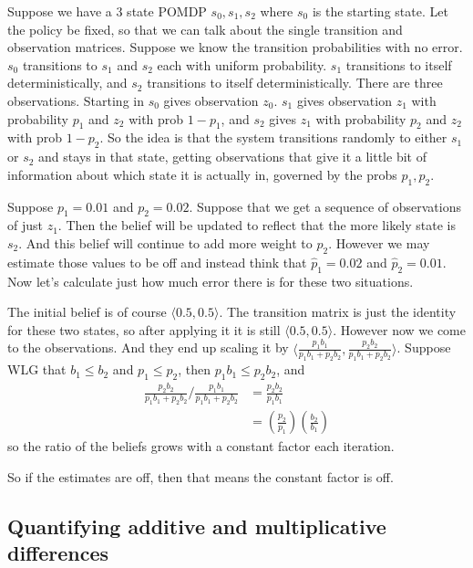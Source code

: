 \documentclass[10pt,english]{article}
\begin{document}
Suppose we have a 3 state POMDP $s_0, s_1, s_2$ where $s_0$ is the starting state. Let the policy be fixed, so that we can talk about the single transition and observation matrices. Suppose we know the transition probabilities with no error. $s_0$ transitions to $s_1$ and $s_2$ each with uniform probability. $s_1$ transitions to itself deterministically, and $s_2$ transitions to itself deterministically. There are three observations. Starting in $s_0$ gives observation $z_0$. $s_1$ gives observation $z_1$ with probability $p_1$ and $z_2$ with prob $1-p_1$, and $s_2$ gives $z_1$ with probability $p_2$ and $z_2$ with prob $1-p_2$. So the idea is that the system transitions randomly to either $s_1$ or $s_2$ and stays in that state, getting observations that give it a little bit of information about which state it is actually in, governed by the probs $p_1,p_2$.

Suppose $p_1 = 0.01$ and $p_2 = 0.02$. Suppose that we get a sequence of observations of just $z_1$. Then the belief will be updated to reflect that the more likely state is $s_2$. And this belief will continue to add more weight to $p_2$. However we may estimate those values to be off and instead think that $\hat{p}_1 = 0.02$ and $\hat{p}_2 = 0.01$. Now let's calculate just how much error there is for these two situations.

The initial belief is of course $\langle 0.5, 0.5 \rangle$. The transition matrix is just the identity for these two states, so after applying it it is still $\langle 0.5, 0.5 \rangle$. However now we come to the observations. And they end up scaling it by $\langle \frac{p_1 b_1}{p_1 b_1 + p_2 b_2} , \frac{p_2 b_2}{p_1 b_1 + p_2 b_2} \rangle$. Suppose WLG that $b_1 \leq b_2$ and $p_1 \leq p_2$, then $p_1 b_1 \leq p_2 b_2$, and
\begin{align}
\frac{p_2 b_2}{p_1 b_1 + p_2 b_2} / \frac{p_1 b_1}{p_1 b_1 + p_2 b_2} &= \frac{p_2 b_2}{p_1 b_1} \\
&= \left( \frac{p_2}{p_1} \right) \left( \frac{b_2}{b_1} \right)
\end{align}
so the ratio of the beliefs grows with a constant factor each iteration.

So if the estimates are off, then that means the constant factor is off.

\subsection{Quantifying additive and multiplicative differences}
\end{document}
